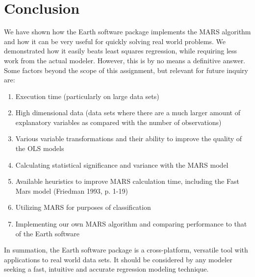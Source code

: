 

\graphicspath{{C:/Documents and Settings/amcelhinney/My Documents/GitHub/MCS507ProjectTwo/tex/include/}}

\section{Conclusion} %
We have shown how the Earth software package implements the MARS algorithm and how it can be very useful for quickly solving real world problems. We demonstrated how it easily beats least squares regression, while requiring less work from the actual modeler. However, this is by no means a definitive answer. Some factors beyond the scope of this assignment, but relevant for future inquiry are:
\begin{enumerate}
\item Execution time (particularly on large data sets)
\item High dimensional data (data sets where there are a much larger amount of explanatory variables as compared with the number of observations)
\item Various variable transformations and their ability to improve the quality of the OLS models
\item Calculating statistical significance and variance with the MARS model
\item Available heuristics to improve MARS calculation time, including the Fast Mars model (Friedman 1993, p. 1-19)
\item Utilizing MARS for purposes of classification 
\item Implementing our own MARS algorithm and comparing performance to that of the Earth software
\end{enumerate}

In summation, the Earth software package is a cross-platform, versatile tool with applications to real world data sets. It should be considered by any modeler seeking a fast, intuitive and accurate regression modeling technique.